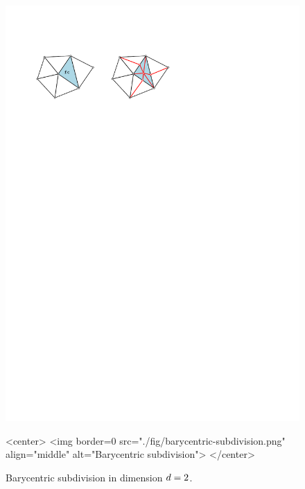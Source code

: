 \begin{figure}[htbp]
\begin{ccTexOnly}
\begin{center}
\includegraphics{Triangulation/fig/barycentric-subdivision.pdf}
\end{center}
\end{ccTexOnly}
\begin{ccHtmlOnly}
<center>
<img border=0 src="./fig/barycentric-subdivision.png" align="middle"
alt="Barycentric subdivision">
</center>
\end{ccHtmlOnly}
\caption{Barycentric subdivision in  dimension $d=2$.}
\label{triangulation:fig:barycentric}
\end{figure} 

 


